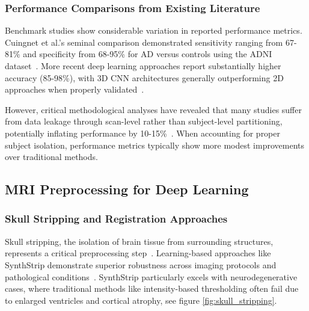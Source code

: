\documentclass[11pt, a4paper]{article}
\begin{document}
\subsubsection{Performance Comparisons from Existing Literature}

Benchmark studies show considerable variation in reported performance metrics. Cuingnet et al.'s seminal comparison demonstrated sensitivity ranging from 67-81\% and specificity from 68-95\% for AD versus controls using the ADNI dataset~\cite{cuingnet2011automatic}. More recent deep learning approaches report substantially higher accuracy (85-98\%), with 3D CNN architectures generally outperforming 2D approaches when properly validated~\cite{basaia2019automated, garg2023review}.

However, critical methodological analyses have revealed that many studies suffer from data leakage through scan-level rather than subject-level partitioning, potentially inflating performance by 10-15\%~\cite{davatzikos2019machine}. When accounting for proper subject isolation, performance metrics typically show more modest improvements over traditional methods.

\subsection{MRI Preprocessing for Deep Learning}

\subsubsection{Skull Stripping and Registration Approaches}

Skull stripping, the isolation of brain tissue from surrounding structures, represents a critical preprocessing step~\cite{fatima2020state}. Learning-based approaches like SynthStrip demonstrate superior robustness across imaging protocols and pathological conditions~\cite{hoopes2022synthstrip}. SynthStrip particularly excels with neurodegenerative cases, where traditional methods like intensity-based thresholding often fail due to enlarged ventricles and cortical atrophy, see figure \ref{fig:skull_stripping}.
\end{document}
